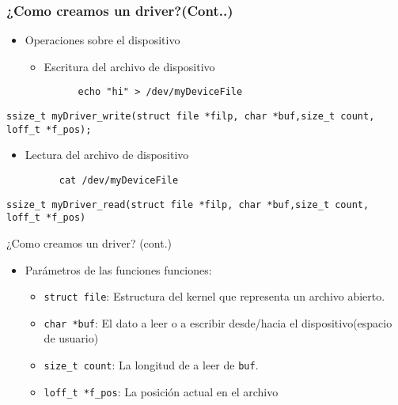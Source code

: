 \begin{frame}[fragile]
\frametitle{¿Como creamos un driver?(Cont..)}
  \begin{itemize}
  \item Operaciones sobre el dispositivo  
  \begin{itemize}
    \item Escritura del archivo de dispositivo 
      \begin{lstlisting}
      echo "hi" > /dev/myDeviceFile
      \end{lstlisting}  
  \end{itemize}	
  \end{itemize}
\begin{lstlisting}
ssize_t myDriver_write(struct file *filp, char *buf,size_t count, loff_t *f_pos);
\end{lstlisting}

\begin{itemize}
  \item Lectura del archivo de dispositivo  
      \begin{lstlisting}
      cat /dev/myDeviceFile
      \end{lstlisting}  
 \end{itemize}

\begin{lstlisting}
ssize_t myDriver_read(struct file *filp, char *buf,size_t count, loff_t *f_pos)
\end{lstlisting}
\end{frame}

\begin{frame}{¿Como creamos un driver? (cont.)}

  \begin{itemize}
  \item Parámetros de las funciones funciones:
 	 \begin{itemize}
 	   \item \texttt{struct file}: Estructura del kernel que representa un archivo abierto.
	   \item \texttt{char *buf}: El dato a leer o a escribir desde/hacia el dispositivo(espacio de usuario) 
	   \item \texttt{size\_t count}: La longitud de a leer de \texttt{buf}.
           \item \texttt{loff\_t *f\_pos}: La posición actual en el archivo
 	 \end{itemize}  
  \end{itemize}
\end{frame}


